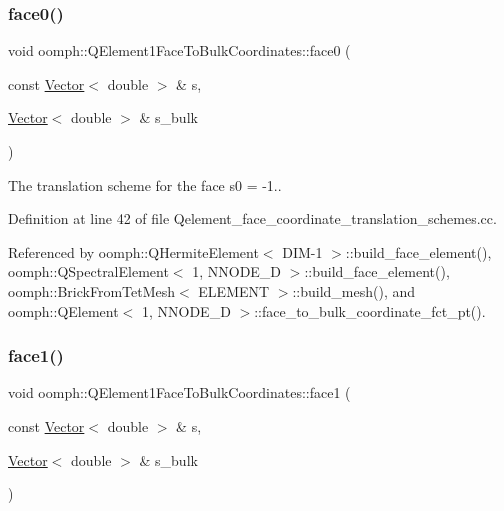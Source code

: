 \subsubsection{\texorpdfstring{face0()}{face0()}}
{\footnotesize\ttfamily void oomph\+::\+Q\+Element1\+Face\+To\+Bulk\+Coordinates\+::face0 (\begin{DoxyParamCaption}\item[{const \hyperlink{classoomph_1_1Vector}{Vector}$<$ double $>$ \&}]{s,  }\item[{\hyperlink{classoomph_1_1Vector}{Vector}$<$ double $>$ \&}]{s\+\_\+bulk }\end{DoxyParamCaption})}



The translation scheme for the face s0 = -\/1.. 



Definition at line 42 of file Qelement\+\_\+face\+\_\+coordinate\+\_\+translation\+\_\+schemes.\+cc.



Referenced by oomph\+::\+Q\+Hermite\+Element$<$ D\+I\+M-\/1 $>$\+::build\+\_\+face\+\_\+element(), oomph\+::\+Q\+Spectral\+Element$<$ 1, N\+N\+O\+D\+E\+\_\+D $>$\+::build\+\_\+face\+\_\+element(), oomph\+::\+Brick\+From\+Tet\+Mesh$<$ E\+L\+E\+M\+E\+N\+T $>$\+::build\+\_\+mesh(), and oomph\+::\+Q\+Element$<$ 1, N\+N\+O\+D\+E\+\_\+D $>$\+::face\+\_\+to\+\_\+bulk\+\_\+coordinate\+\_\+fct\+\_\+pt().

\mbox{\label{namespaceoomph_1_1QElement1FaceToBulkCoordinates_a50a127a1f2d888860d1edfd993807656}} 
\subsubsection{\texorpdfstring{face1()}{face1()}}
{\footnotesize\ttfamily void oomph\+::\+Q\+Element1\+Face\+To\+Bulk\+Coordinates\+::face1 (\begin{DoxyParamCaption}\item[{const \hyperlink{classoomph_1_1Vector}{Vector}$<$ double $>$ \&}]{s,  }\item[{\hyperlink{classoomph_1_1Vector}{Vector}$<$ double $>$ \&}]{s\+\_\+bulk }\end{DoxyParamCaption})}



